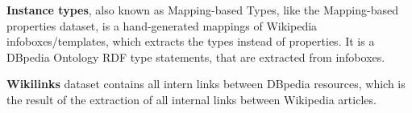 \documentclass[10pt,a4paper]{article}
\newcommand{\todo}[1]{{\color{red}\textsf{\textbf{TODO}}: #1}}
\begin{document}
\textbf{Instance types}, also known as Mapping-based Types, like the Mapping-based properties dataset, is a hand-generated mappings of Wikipedia infoboxes/templates, which extracts the types instead of properties. It is a DBpedia Ontology RDF type statements, that are extracted from infoboxes.

\textbf{Wikilinks} dataset contains all intern links between DBpedia resources, which is the result of the extraction of all internal links between Wikipedia articles.







\end{document}
